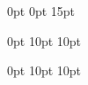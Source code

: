 \documentclass{report}
\begin{document}
\newbox\namebox
\newdimen\signboxdim

\def\signature#1{%
    \setbox\namebox=\hbox{#1}
    \signboxdim=\dimexpr(\wd\namebox+3cm)
    \parbox[t]{\signboxdim}{%
        \centering
            \hrulefill\\    %
            #1
        \par}%
    }


\titlespacing*{\section} {0pt} {0pt} {15pt} %

\titlespacing*{\subsection} {0pt} {10pt} {10pt}

\titlespacing*{\subsubsection} {0pt} {10pt} {10pt}


\pagestyle{fancy}  %
\fancyhf{}  %

\renewcommand{\headrulewidth}{0pt}  %
\end{document}
